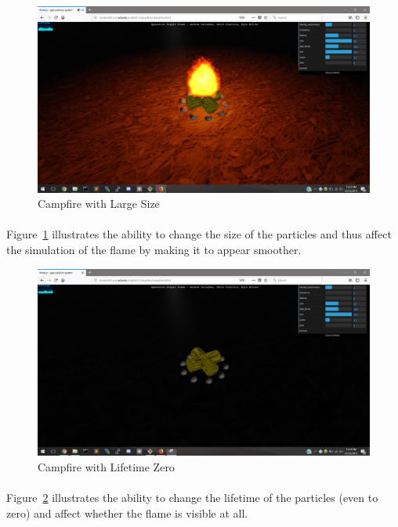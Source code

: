 \documentclass[letterpaper]{article}
\begin{document}
\begin{figure}[H]
\centering
\includegraphics[scale=.35]{result7.JPG}
\caption{Campfire with Large Size}
\label{fig:result7}
\end{figure}
\paragraph{}
Figure~\ref{fig:result7} illustrates the ability to change the size of the particles and thus affect the simulation of the flame by making it to appear smoother.

\begin{figure}[H]
\centering
\includegraphics[scale=.35]{result8.JPG}
\caption{Campfire with Lifetime Zero}
\label{fig:result8}
\end{figure}
\paragraph{}
Figure~\ref{fig:result8} illustrates the ability to change the lifetime of the particles (even to zero) and affect whether the flame is visible at all.
\end{document}
